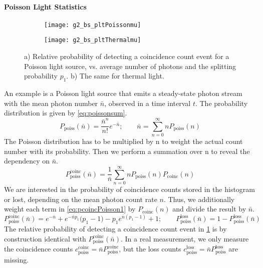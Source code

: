 \paragraph{Poisson Light Statistics}
\begin{figure}[htp]
	\centering
	\begin{subfigure}{0.49\linewidth}
		\centering
		\texttt{[image: g2\_bs\_pltPoissonmu]}
		\caption{}
		\label{fig:pltPoissonmu}
	\end{subfigure}
	\hfill
	\begin{subfigure}{0.49\linewidth}
		\centering
		\texttt{[image: g2\_bs\_pltThermalmu]}
		\caption{}
		\label{fig:pltThermalmu}
	\end{subfigure}
	\caption{a) Relative probability of detecting a coincidence count event for a Poisson light source, vs. average number of photons and the splitting probability $p_1$. b) The same for thermal light.}
\end{figure}
\noindent An example is a Poisson light source that emits a steady-state photon stream with the mean photon number $\bar{n}$, observed in a time interval $t$. The probability distribution is given by \cref{eq:poissonsum}.
\begin{equation}\label{eq:poissonsum}
	P_\mathrm{poiss}(\bar{n})=\dfrac{\bar{n}^n}{n!}e^{-\bar{n}};\qquad \bar{n}=\sum_{n=0}^\infty n P_\mathrm{poiss}(n)
\end{equation}
The Poisson distribution has to be multiplied by n to weight the actual count number with its probability. Then we perform a summation over n to reveal the dependency on $\bar{n}$.
\begin{equation}\label{eq:pcoincPoisson1}
	P_\mathrm{poiss}^\mathrm{coinc}(\bar{n})=\dfrac{1}{\bar{n}}\sum_{n=0}^\infty n P_\mathrm{poiss}(n)P_\mathrm{coinc}(n)
\end{equation}
We are interested in the probability of coincidence counts stored in the histogram or lost, depending on the mean photon count rate $ {n}$. Thus, we additionally weight each term in \cref{eq:pcoincPoisson1} by $P_\mathrm{coinc}(n)$ and divide the result by $\bar{n}$.
\begin{equation}\label{eq:pcoincPoisson2}
	P_\mathrm{poiss}^\mathrm{coinc}(\bar{n})= e^{-\bar{n} }+ e^{-\bar{n} p_1}\Big(p_1-1\Big)-p_1e^{\bar{n} (p_1-1)}+1;\qquad P_\mathrm{poiss}^\mathrm{loss}(\bar{n})=1-P_\mathrm{poiss}^\mathrm{loss}(\bar{n})
\end{equation}
The relative probability of detecting a coincidence count event in \cref{fig:pltPoissonmu} is by construction identical with $P_\mathrm{poiss}^\mathrm{coinc}(\bar{n})$. In a real measurement, we only measure the coincidence counts $c_\mathrm{poiss}^\mathrm{coinc}=\bar{n} P_\mathrm{poiss}^\mathrm{coinc}$, but the loss counts $c_\mathrm{poiss}^\mathrm{loss}=\bar{n} P_\mathrm{poiss}^\mathrm{loss}$ are missing. %

